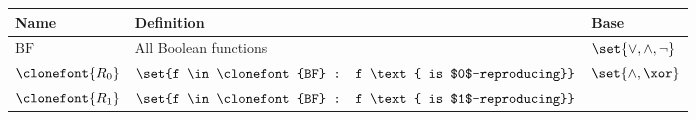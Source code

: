\documentclass[11pt]{article}
\begin{document}
\begin{figure}[hbtp]
    \centering
    \begin{small}
        \begin{longtable}[]{p{}p{}p{}}
            \toprule
            \begin{minipage}[b]{0.12\columnwidth}\raggedright
                Name\strut
            \end{minipage} & \begin{minipage}[b]{0.41\columnwidth}\raggedright
                Definition\strut
            \end{minipage} & \begin{minipage}[b]{0.38\columnwidth}\raggedright
                Base\strut
            \end{minipage}\tabularnewline
            \midrule
            \endhead
            \begin{minipage}[t]{0.12\columnwidth}\raggedright
                \(\mathrm{BF}\)\strut
            \end{minipage} & \begin{minipage}[t]{0.41\columnwidth}\raggedright
                All Boolean functions\strut
            \end{minipage} & \begin{minipage}[t]{0.38\columnwidth}\raggedright
                \(\set{\lor,\land,\neg}\)\strut
            \end{minipage}\tabularnewline
            \begin{minipage}[t]{0.12\columnwidth}\raggedright
                \(\clonefont{R_0}\)\strut
            \end{minipage} & \begin{minipage}[t]{0.41\columnwidth}\raggedright
                \(\set{f \in \clonefont{BF} : f \text{ is $0$-reproducing}}\)\strut
            \end{minipage} & \begin{minipage}[t]{0.38\columnwidth}\raggedright
                \(\set{\land,\xor}\)\strut
            \end{minipage}\tabularnewline
            \begin{minipage}[t]{0.12\columnwidth}\raggedright
                \(\clonefont{R_1}\)\strut
            \end{minipage} & \begin{minipage}[t]{0.41\columnwidth}\raggedright
                \(\set{f \in \clonefont{BF} : f \text{ is $1$-reproducing}}\)\strut
            \end{minipage} & \begin{minipage}[t]{0.38\columnwidth}\raggedright

\end{minipage}
\end{longtable}
\end{small}
\end{figure}
\end{document}
